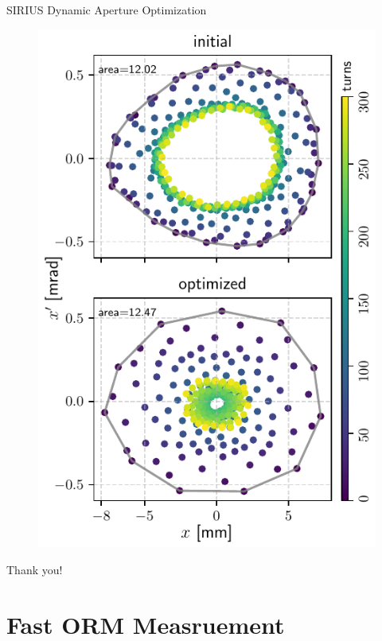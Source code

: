\documentclass[aspectratio=169]{beamer}
\begin{document}
\begin{frame}{SIRIUS Dynamic Aperture Optimization}
\begin{minipage}{0.44\textwidth}
\begin{figure}
            \includegraphics[height=0.9\textheight]{wp3_phase_space.pdf}
        \end{figure}
    \end{minipage}
\end{frame}
\begin{frame}
    Thank you!
\end{frame}

\section{Fast ORM Measruement}
\end{document}
